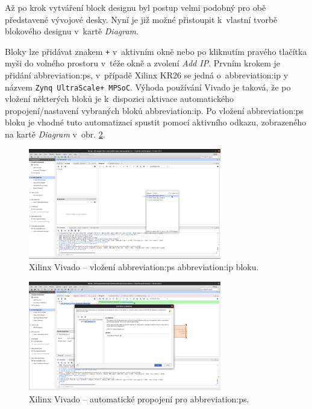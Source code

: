 \documentclass[a4paper, twoside, 11pt]{article}
\begin{document}
				Až po krok vytváření block designu byl postup velmi podobný pro obě představené vývojové desky. Nyní je již možné přistoupit k~vlastní tvorbě blokového designu v~kartě \textit{Diagram}.\par
				Bloky lze přidávat znakem \texttt{+} v~aktivním okně nebo po kliknutím pravého tlačítka myši do volného prostoru v~téže okně a zvolení \textit{Add IP}. Prvním krokem je přidání \gls{abbreviation:ps}, v~případě Xilinx KR26 se jedná o~\gls{abbreviation:ip} y názvem \texttt{Zynq UltraScale+ MPSoC}. Výhoda používání Vivado je taková, že po vložení některých bloků je k~dispozici aktivace automatického propojení/nastavení vybraných bloků \gls{abbreviation:ip}. Po vložení \gls{abbreviation:ps} bloku je vhodné tuto automatizaci spustit pomocí aktivního odkazu, zobrazeného na kartě \textit{Diagram} v~obr. \ref{fig:kr26-xilix-vivado-flow-05}.

				\begin{figure}[htbp!]
					\centering
					\includegraphics[width=0.75\textwidth]{src/png/kr26-xilinx-vivado-flow/kr26-xilix-vivado-flow-04.jpg}
					\caption{Xilinx Vivado – vložení \gls{abbreviation:ps} \gls{abbreviation:ip} bloku.}
					\label{fig:kr26-xilix-vivado-flow-04}
				\end{figure}

				\begin{figure}[htbp!]
					\centering
					\includegraphics[width=0.75\textwidth]{src/png/kr26-xilinx-vivado-flow/kr26-xilix-vivado-flow-05.jpg}
					\caption{Xilinx Vivado – automatické propojení pro \gls{abbreviation:ps}.}
					\label{fig:kr26-xilix-vivado-flow-05}
				\end{figure}
\end{document}
